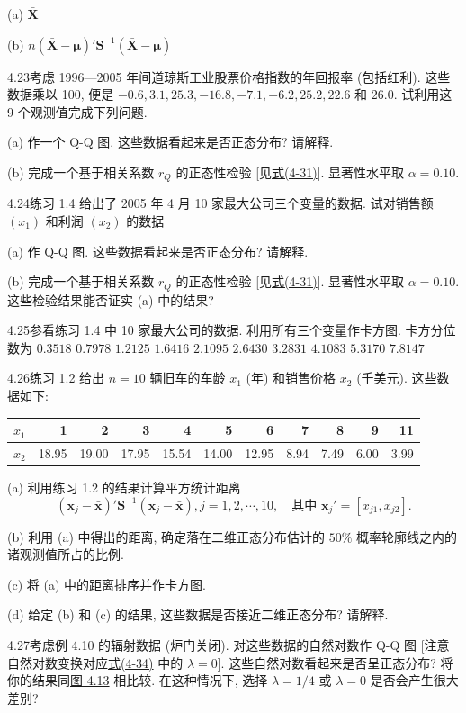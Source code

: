 (a) $\bar{\mathbf{X}}$

(b) $n(\bar{\mathbf{X}}-\boldsymbol{\mu})'\mathbf{S}^{-1}(\bar{\mathbf{X}}-\boldsymbol{\mu})$

4.23\quad 考虑 1996—2005 年间道琼斯工业股票价格指数的年回报率 (包括红利). 这些数据乘以 100, 便是 $-0.6,3.1,25.3,-16.8,-7.1,-6.2,25.2,22.6$ 和 $26.0$. 试利用这 9 个观测值完成下列问题.

(a) 作一个 Q-Q 图. 这些数据看起来是否正态分布? 请解释.

(b) 完成一个基于相关系数 $r_{Q}$ 的正态性检验 [见\hyperref[eq:4-31]{式(4-31)}]. 显著性水平取 $\alpha=0.10$.

4.24\quad 练习 1.4 给出了 2005 年 4 月 10 家最大公司三个变量的数据. 试对销售额 $(x_{1})$ 和利润 $(x_{2})$ 的数据

(a) 作 Q-Q 图. 这些数据看起来是否正态分布? 请解释.

(b) 完成一个基于相关系数 $r_{Q}$ 的正态性检验 [见\hyperref[eq:4-31]{式(4-31)}]. 显著性水平取 $\alpha=0.10$. 这些检验结果能否证实 (a) 中的结果?

4.25\quad 参看练习 1.4 中 10 家最大公司的数据. 利用所有三个变量作卡方图. 卡方分位数为 $0.3518$ $0.7978$ $1.2125$ $1.6416$ $2.1095$ $2.6430$ $3.2831$ $4.1083$ $5.3170$ $7.8147$

4.26\quad 练习 1.2 给出 $n=10$ 辆旧车的车龄 $x_{1}$ (年) 和销售价格 $x_{2}$ (千美元). 这些数据如下:

\begin{mvtable}
\begin{tabular}{lrrrrrrrrrr}
\toprule
$x_{1}$&1&2&3&4&5&6&7&8&9&11\\
\midrule
$x_{2}$&18.95&19.00&17.95&15.54&14.00&12.95&8.94&7.49&6.00&3.99\\
\bottomrule
\end{tabular}
\end{mvtable}

(a) 利用练习 1.2 的结果计算平方统计距离
\[
(\mathbf{x}_{j}-\bar{\mathbf{x}})'\mathbf{S}^{-1}(\mathbf{x}_{j}-\bar{\mathbf{x}}),j=1,2,\cdots,10,\quad\text{其中 } \mathbf{x}_{j}'=[x_{j1},x_{j2}].
\]

(b) 利用 (a) 中得出的距离, 确定落在二维正态分布估计的 $50\%$ 概率轮廓线之内的诸观测值所占的比例.

(c) 将 (a) 中的距离排序并作卡方图.

(d) 给定 (b) 和 (c) 的结果, 这些数据是否接近二维正态分布? 请解释.

4.27\quad 考虑例 4.10 的辐射数据 (炉门关闭). 对这些数据的自然对数作 Q-Q 图 [注意自然对数变换对应\hyperref[eq:4-34]{式(4-34)} 中的 $\lambda=0$]. 这些自然对数看起来是否呈正态分布? 将你的结果同\hyperref[fig:4.13]{图 4.13} 相比较. 在这种情况下, 选择 $\lambda=1/4$ 或 $\lambda=0$ 是否会产生很大差别?

